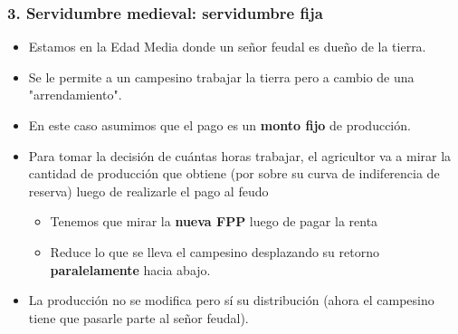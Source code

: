 \documentclass{beamer}
\begin{document}
\begin{frame}
\frametitle{3. Servidumbre medieval: servidumbre fija }
\begin{itemize}
    \item Estamos en la Edad Media donde un señor feudal es dueño de la tierra. 
    \item Se le permite a un campesino trabajar la tierra pero a cambio de una "arrendamiento". 
    \item  En este caso asumimos que el pago es un \textbf{monto fijo} de producción. \vspace{1mm}
    \item Para tomar la decisión de cuántas horas trabajar, el agricultor va a mirar la cantidad de producción que obtiene (por sobre su curva de indiferencia de reserva) luego de realizarle el pago al feudo \vspace{1mm}
        \begin{itemize}
        \item Tenemos que mirar la \textbf{nueva FPP} luego de pagar la renta
        \item Reduce lo que se lleva el campesino desplazando su retorno \textbf{paralelamente} hacia abajo. \vspace{1mm}
        \end{itemize}
    \item La producción no se modifica pero sí su distribución (ahora el campesino tiene que pasarle parte al señor feudal). 
\end{itemize}
\end{frame}
\end{document}

